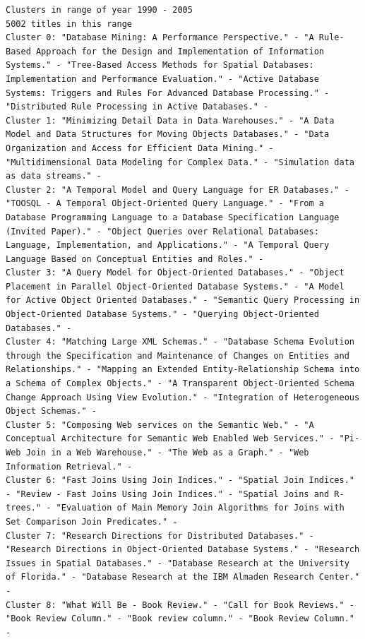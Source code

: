 \documentclass[a4paper,fontsize=11pt]{article}
\begin{document}
\begin{lstlisting}[caption={KMeans output},label={lst:output},breaklines]
Clusters in range of year 1990 - 2005
5002 titles in this range
Cluster 0: "Database Mining: A Performance Perspective." - "A Rule-Based Approach for the Design and Implementation of Information Systems." - "Tree-Based Access Methods for Spatial Databases: Implementation and Performance Evaluation." - "Active Database Systems: Triggers and Rules For Advanced Database Processing." - "Distributed Rule Processing in Active Databases." - 
Cluster 1: "Minimizing Detail Data in Data Warehouses." - "A Data Model and Data Structures for Moving Objects Databases." - "Data Organization and Access for Efficient Data Mining." - "Multidimensional Data Modeling for Complex Data." - "Simulation data as data streams." - 
Cluster 2: "A Temporal Model and Query Language for ER Databases." - "TOOSQL - A Temporal Object-Oriented Query Language." - "From a Database Programming Language to a Database Specification Language (Invited Paper)." - "Object Queries over Relational Databases: Language, Implementation, and Applications." - "A Temporal Query Language Based on Conceptual Entities and Roles." - 
Cluster 3: "A Query Model for Object-Oriented Databases." - "Object Placement in Parallel Object-Oriented Database Systems." - "A Model for Active Object Oriented Databases." - "Semantic Query Processing in Object-Oriented Database Systems." - "Querying Object-Oriented Databases." - 
Cluster 4: "Matching Large XML Schemas." - "Database Schema Evolution through the Specification and Maintenance of Changes on Entities and Relationships." - "Mapping an Extended Entity-Relationship Schema into a Schema of Complex Objects." - "A Transparent Object-Oriented Schema Change Approach Using View Evolution." - "Integration of Heterogeneous Object Schemas." - 
Cluster 5: "Composing Web services on the Semantic Web." - "A Conceptual Architecture for Semantic Web Enabled Web Services." - "Pi-Web Join in a Web Warehouse." - "The Web as a Graph." - "Web Information Retrieval." - 
Cluster 6: "Fast Joins Using Join Indices." - "Spatial Join Indices." - "Review - Fast Joins Using Join Indices." - "Spatial Joins and R-trees." - "Evaluation of Main Memory Join Algorithms for Joins with Set Comparison Join Predicates." - 
Cluster 7: "Research Directions for Distributed Databases." - "Research Directions in Object-Oriented Database Systems." - "Research Issues in Spatial Databases." - "Database Research at the University of Florida." - "Database Research at the IBM Almaden Research Center." - 
Cluster 8: "What Will Be - Book Review." - "Call for Book Reviews." - "Book Review Column." - "Book review column." - "Book Review Column." - 

\end{lstlisting}
\end{document}
